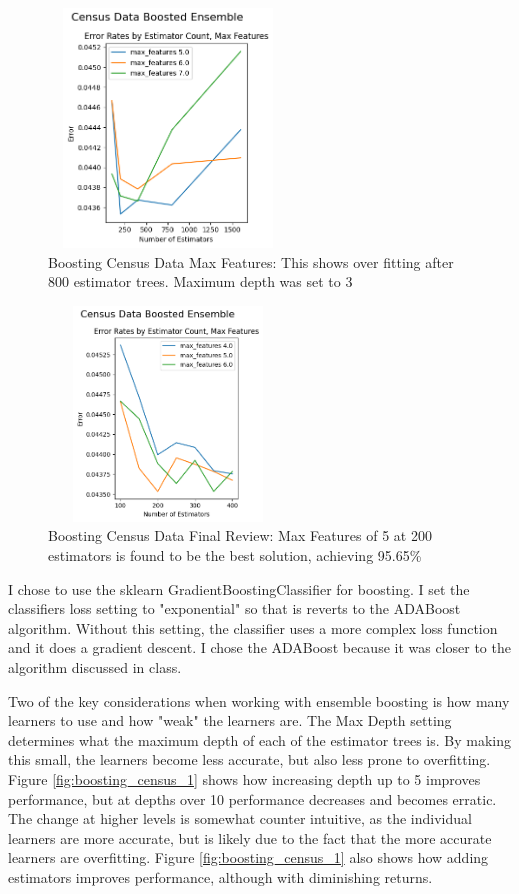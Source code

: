 \documentclass[letterpaper]{article} %
\begin{document}
\begin{figure}[h]
\centering
\includegraphics[width=2.5in, height=2.5in]{figures/Census_Data_Boosting_Estimator_Count_by_Max_Depth_boosting_3.png}
\caption{Boosting Census Data Max Features:  This shows over fitting after 800 estimator trees.  Maximum depth was set to 3  }
\label{fig:boosting_census_3}
\end{figure}

\begin{figure}[h]
\centering
\includegraphics[width=2.5in, height=2.25in]{figures/Census_Data_Boosting_Estimator_Count_by_Max_Depth_boosting_4.png}
\caption{Boosting Census Data Final Review:  Max Features of 5 at 200 estimators is found to be the best solution, achieving  95.65\% }
\label{fig:boosting_census_4}
\end{figure}

I chose to use the sklearn GradientBoostingClassifier for boosting.  I set the classifiers loss setting to "exponential" so that is reverts to the ADABoost algorithm. Without this setting, the classifier uses a more complex loss function and it does a gradient descent.  I chose the ADABoost because it was closer to the algorithm discussed in class.

Two of the key considerations when working with ensemble boosting is how many learners to use and how "weak" the learners are.  The Max Depth setting determines what the maximum depth of each of the estimator trees is.  By making this small, the learners become less accurate, but also less prone to overfitting. Figure \ref{fig:boosting_census_1} shows how increasing depth up to 5 improves performance, but at depths over 10 performance decreases and becomes erratic.  The change at higher levels is somewhat counter intuitive, as the individual learners are more accurate, but is likely due to the fact that the more accurate learners are overfitting.  Figure \ref{fig:boosting_census_1} also shows how adding estimators improves performance, although with diminishing returns.  
\end{document}
